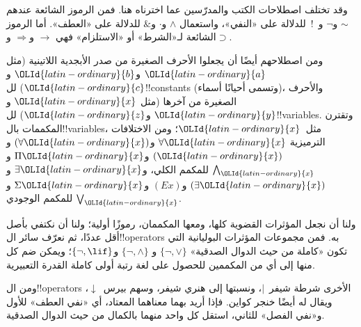 \documentclass[../../../include/open-logic-section]{subfiles}
\begin{document}

\begin{intro}
وقد تختلف اصطلاحات الكتب والمدرّسين عما اخترناه هنا. فمن الرموز
الشائعة عندهم $\sim$ و$\neg$ و~!\ للدلالة على
«النفي»، واستعمال $\wedge$ و$\cdot$ و$\&$ للدلالة على «العطف». أما
الرموز الشائعة لـ«الشرط» أو «الاستلزام» فهي $\rightarrow$
و$\Rightarrow$ و$\supset$.

ومن اصطلاحهم أيضًا أن يجعلوا الأحرف الصغيرة من صدر الأبجدية اللاتينية (مثل
${\OLId{latin-ordinary}{a}}$ و${\OLId{latin-ordinary}{b}}$ و${\OLId{latin-ordinary}{c}}$) لل!!{constant}s (وتسمى أحيانًا أسماء)، والأحرف
الصغيرة من آخرها (مثل ${\OLId{latin-ordinary}{x}}$ و${\OLId{latin-ordinary}{y}}$ و${\OLId{latin-ordinary}{z}}$) لل!!{variable}s. وتقترن
المكممات بال!!{variable}s، مثل~${\OLId{latin-ordinary}{x}}$؛ ومن الاختلافات الترميزية
$\forall {\OLId{latin-ordinary}{x}}$ و$(\forall {\OLId{latin-ordinary}{x}})$ و$({\OLId{latin-ordinary}{x}})$ و$\Pi {\OLId{latin-ordinary}{x}}$ و$\bigwedge_{\OLId{latin-ordinary}{x}}$ للمكمم
الكلي، و$\exists {\OLId{latin-ordinary}{x}}$ و$(\exists {\OLId{latin-ordinary}{x}})$ و$(Ex)$ و$\Sigma {\OLId{latin-ordinary}{x}}$ و
$\bigvee_{\OLId{latin-ordinary}{x}}$ للمكمم الوجودي.
\end{intro}

\begin{explain}
ولنا أن نجعل المؤثرات القضوية كلها، ومعها المكممان، رموزًا أولية؛
ولنا أن نكتفي بأصل أقل عددًا، ثم نعرّف سائر
ال!!{operator}s به. فمن مجموعات المؤثرات البوليانية التي تكون
«كاملة من حيث الدوال الصدقية» $\{ \lnot, \lor \}$ و
$\{ \lnot, \land \}$ و$\{ \lnot, \lif\}$؛ ويمكن ضم كل منها إلى أي
من المكممين للحصول على لغة رتبة أولى كاملة القدرة التعبيرية.

ومن ال!!{operator}s الأخرى شرطة شيفر~$|$، ونسبتها إلى
هنري شيفر، وسهم بيرس~$\downarrow$، ويقال له أيضًا خنجر كواين.
فإذا أريد بهما معناهما المعتاد، أي «نفي العطف» للأول و«نفي الفصل»
للثاني، استقل كل واحد منهما بالكمال من حيث الدوال الصدقية.
\end{explain}
\end{document}
